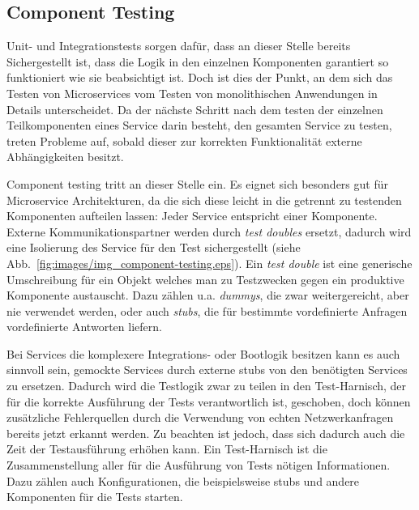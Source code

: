 \documentclass[12pt,a4paper,bibliography=totocnumbered,listof=totocnumbered]{scrartcl}
\begin{document}

\subsection{Component Testing}

Unit- und Integrationstests sorgen dafür, dass an dieser Stelle bereits Sichergestellt ist, dass die Logik in den einzelnen Komponenten garantiert so funktioniert wie sie beabsichtigt ist. Doch ist dies der Punkt, an dem sich das Testen von Microservices vom Testen von monolithischen Anwendungen in Details unterscheidet. Da der nächste Schritt nach dem testen der einzelnen Teilkomponenten eines Service darin besteht, den gesamten Service zu testen, treten Probleme auf, sobald dieser zur korrekten Funktionalität externe Abhängigkeiten besitzt.

Component testing tritt an dieser Stelle ein. Es eignet sich besonders gut für Microservice Architekturen, da die sich diese leicht in die getrennt zu testenden Komponenten aufteilen lassen: Jeder Service entspricht einer Komponente. Externe Kommunikationspartner werden durch \textit{test doubles} ersetzt, dadurch wird eine Isolierung des Service für den Test sichergestellt (siehe Abb.~\ref{fig:images/img_component-testing.eps}).\cite{clemson} Ein \textit{test double} ist eine generische Umschreibung für ein Objekt welches man zu Testzwecken gegen ein produktive Komponente austauscht. Dazu zählen u.a. \textit{dummys}, die zwar weitergereicht, aber nie verwendet werden, oder auch \textit{stubs}, die für bestimmte vordefinierte Anfragen vordefinierte Antworten liefern.\cite{fowlertestdouble}


Bei Services die komplexere Integrations- oder Bootlogik besitzen kann es auch sinnvoll sein, gemockte Services durch externe stubs von den benötigten Services zu ersetzen. Dadurch wird die Testlogik zwar zu teilen in den Test-Harnisch, der für die korrekte Ausführung der Tests verantwortlich ist, geschoben, doch können zusätzliche Fehlerquellen durch die Verwendung von echten Netzwerkanfragen bereits jetzt erkannt werden. Zu beachten ist jedoch, dass sich dadurch auch die Zeit der Testausführung erhöhen kann.\cite{clemson} Ein Test-Harnisch ist die Zusammenstellung aller für die Ausführung von Tests nötigen Informationen. Dazu zählen auch Konfigurationen, die beispielsweise stubs und andere Komponenten für die Tests starten.
\end{document}
